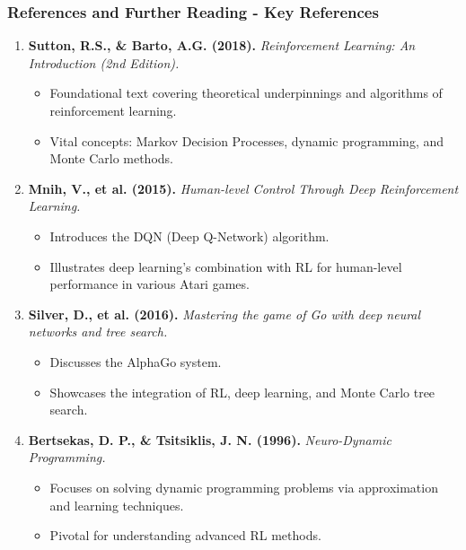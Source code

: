 \documentclass[aspectratio=169]{beamer}
\begin{document}
\begin{frame}[fragile]
  \frametitle{References and Further Reading - Key References}
  
  \begin{enumerate}
    \item \textbf{Sutton, R.S., \& Barto, A.G. (2018).}
    \textit{Reinforcement Learning: An Introduction (2nd Edition).} 
    \begin{itemize}
        \item Foundational text covering theoretical underpinnings and algorithms of reinforcement learning.
        \item Vital concepts: Markov Decision Processes, dynamic programming, and Monte Carlo methods.
    \end{itemize}
    
    \item \textbf{Mnih, V., et al. (2015).}
    \textit{Human-level Control Through Deep Reinforcement Learning.}
    \begin{itemize}
        \item Introduces the DQN (Deep Q-Network) algorithm.
        \item Illustrates deep learning's combination with RL for human-level performance in various Atari games.
    \end{itemize}

    \item \textbf{Silver, D., et al. (2016).}
    \textit{Mastering the game of Go with deep neural networks and tree search.}
    \begin{itemize}
        \item Discusses the AlphaGo system.
        \item Showcases the integration of RL, deep learning, and Monte Carlo tree search.
    \end{itemize}
  
    \item \textbf{Bertsekas, D. P., \& Tsitsiklis, J. N. (1996).}
    \textit{Neuro-Dynamic Programming.}
    \begin{itemize}
        \item Focuses on solving dynamic programming problems via approximation and learning techniques.
        \item Pivotal for understanding advanced RL methods.
    \end{itemize}
  \end{enumerate}
  
\end{frame}
\end{document}
